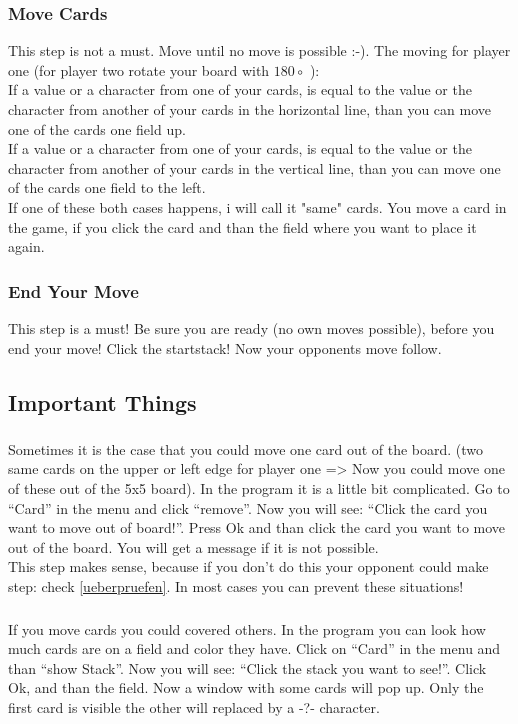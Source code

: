 \documentclass[12pt]{article}
\begin{document}
\subsubsection{Move Cards}
This step is not a must.
Move until no move is possible :-).
The moving for player one (for player two rotate your board with $180 \circ$ ):\\
If a value or a character from one of your cards, is equal to the value or the character from another of your
cards in the horizontal line, than you can move one of the cards one field up.\\
If a value or a character from one of your cards, is equal to the value or the character from another of your
cards in the vertical line, than you can move one of the cards one field to the left.\\
If one of these both cases happens, i will call it "same" cards.
You move a card in the game, if you click the card and than the field where you want to place it again.
\subsubsection{End Your Move}
This step is a must!
Be sure you are ready (no own moves possible), before you end your move!
Click the startstack! Now your opponents move follow.
\subsection{Important Things}
\subsubsection{}
Sometimes it is the case that you could move one card out of the board. (two same cards on the upper or left edge for player one => Now you could move one of these out of the 5x5 board). In the program it is a little bit complicated. Go to "`Card"' in the menu and click "`remove"'. Now you will see: "`Click the card you want to move out of board!"'. Press Ok and than click the card you want to move out of the board. You will get a message if it is not possible.\\
This step makes sense, because if you don't do this your opponent could make step: check \ref{ueberpruefen}. In most cases you can prevent these situations!
\subsubsection{}
If you move cards you could covered others. In the program you can look how much cards are on a field and color they have. Click on "`Card"' in the menu and than "`show Stack"'. Now you will see: "`Click the stack you want to see!"'. Click Ok, and than the field. Now a window with some cards will pop up. Only the first card is visible the other will replaced by a -?- character.
\end{document}
